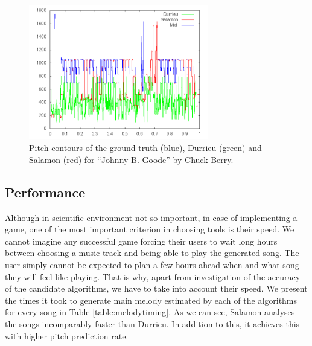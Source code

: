 \begin{figure}[h]
	\centering
   \includegraphics[width=0.7\textwidth]{Figures/Johnny}
\caption{Pitch contours of the ground truth (blue), Durrieu (green) and Salamon (red) for ``Johnny B. Goode'' by Chuck Berry.}
\label{fig:jonny}
\end{figure}


\subsection{Performance}

Although in scientific environment not so important, in case of implementing a game, one of the most important criterion in choosing tools is their speed. We cannot imagine any successful game forcing their users to wait long hours between choosing a music track and being able to play the generated song. The user simply cannot be expected to plan a few hours ahead when and what song they will feel like playing. That is why, apart from investigation of the accuracy of the candidate algorithms, we have to take into account their speed. We present the times it took to generate main melody estimated by each of the algorithms for every song in Table \ref{table:melodytiming}. As we can see, Salamon analyses the songs incomparably faster than Durrieu. In addition to this, it achieves this with higher pitch prediction rate.


\vspace{20pt}

